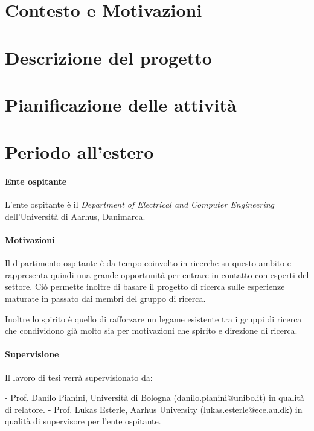 \documentclass[12pt, a4paper]{article}
\begin{document}


\section{Contesto e Motivazioni} \label{sec:context}

\section{Descrizione del progetto}

\section{Pianificazione delle attività}

\section{Periodo all'estero}

\paragraph{Ente ospitante}
L'ente ospitante è il \textit{Department of Electrical and Computer Engineering} dell'Università di Aarhus, Danimarca.

\paragraph{Motivazioni}
Il dipartimento ospitante è da tempo coinvolto in ricerche su questo ambito e rappresenta
quindi una grande opportunità per entrare in contatto con esperti del settore.
Ciò permette inoltre di basare il progetto di ricerca sulle esperienze maturate in passato
dai membri del gruppo di ricerca.

Inoltre lo spirito è quello di rafforzare un legame esistente tra i gruppi di ricerca che
condividono già molto sia per motivazioni che spirito e direzione di ricerca.

\paragraph{Supervisione}
Il lavoro di tesi verrà supervisionato da:

- Prof. Danilo Pianini, Università di Bologna (danilo.pianini@unibo.it) in qualità di relatore.
- Prof. Lukas Esterle, Aarhus University (lukas.esterle@ece.au.dk) in qualità di supervisore per l'ente ospitante.
\end{document}
